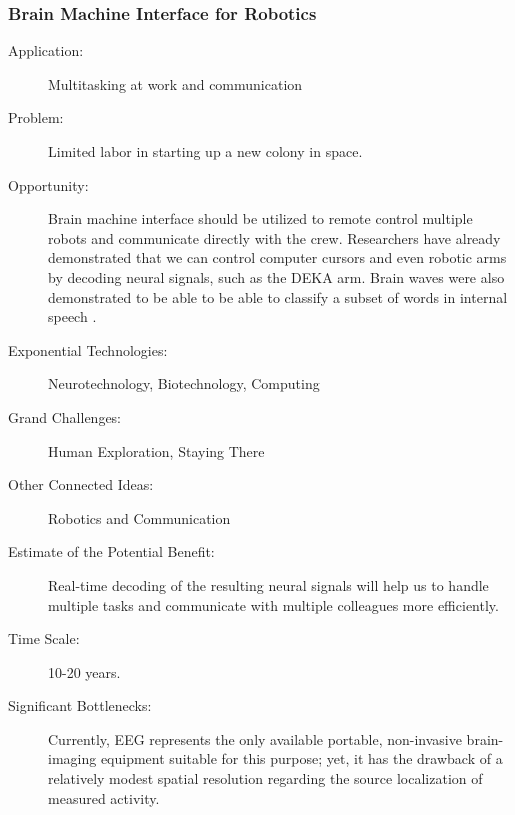 \subsubsection{Brain Machine Interface for Robotics}
\label{bmi}
\begin{description}  \item[Application:] Multitasking at work and communication
 
\item[Problem:] Limited labor in  starting up a new colony in space.
 
\item[Opportunity:] Brain machine interface should be utilized to remote control multiple robots and  communicate directly with the crew. Researchers have already  demonstrated that we can control computer cursors and even robotic arms by decoding neural signals, such as the DEKA arm. Brain waves were also  demonstrated to be able to be able to classify a subset of words in  internal speech \cite{Suppes1997}.
 
\item[Exponential Technologies:]  Neurotechnology, Biotechnology, Computing
 
\item[Grand Challenges:] Human Exploration, Staying There
 
\item[Other Connected Ideas:]  Robotics and Communication
 
\item[Estimate of the Potential  Benefit:]Real-time decoding of the resulting neural signals will help us  to handle multiple tasks and communicate with multiple colleagues more  efficiently.
 
\item[Time Scale:] 10-20 years.
 
\item[Significant Bottlenecks:]  Currently, EEG represents the only available portable, non-invasive  brain-imaging equipment suitable for this purpose; yet, it has the  drawback of a relatively modest spatial resolution regarding the source  localization of measured activity.
 
\end{description}

